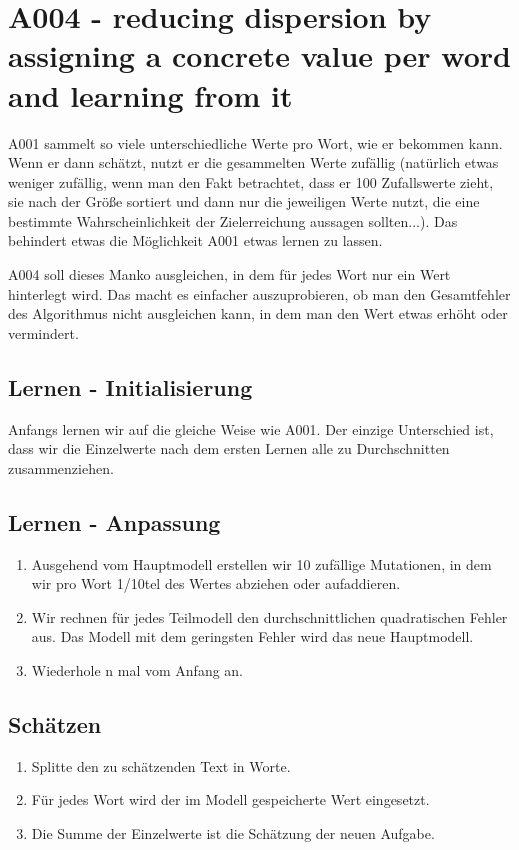 \newpage{}

\section{A004 - reducing dispersion by assigning a concrete value per
word and learning from
it}

A001 sammelt so viele unterschiedliche Werte pro Wort, wie er bekommen kann. 
Wenn er dann schätzt, nutzt er die gesammelten Werte zufällig (natürlich etwas weniger zufällig, wenn man den Fakt betrachtet, dass er 100 Zufallswerte zieht, sie nach der Größe sortiert und dann nur die jeweiligen Werte nutzt, die eine bestimmte Wahrscheinlichkeit der Zielerreichung aussagen sollten...).
Das behindert etwas die Möglichkeit A001 etwas lernen zu lassen.

A004 soll dieses Manko ausgleichen, in dem für jedes Wort nur ein Wert hinterlegt wird. Das macht es einfacher auszuprobieren, ob man den Gesamtfehler des Algorithmus nicht ausgleichen kann, in dem man den Wert etwas erhöht oder vermindert.

\subsection{Lernen - Initialisierung}

Anfangs lernen wir auf die gleiche Weise wie A001. 
Der einzige Unterschied ist, dass wir die Einzelwerte nach dem ersten Lernen alle zu Durchschnitten zusammenziehen. 

\subsection{Lernen - Anpassung}

\begin{enumerate}
        \tightlist
        \item Ausgehend vom Hauptmodell erstellen wir 10 zufällige Mutationen, in dem wir pro Wort 1/10tel des Wertes abziehen oder aufaddieren.
        \item Wir rechnen für jedes Teilmodell den durchschnittlichen quadratischen Fehler aus. Das Modell mit dem geringsten Fehler wird das neue Hauptmodell.
        \item Wiederhole n mal vom Anfang an.
\end{enumerate}

\subsection{Schätzen}

\begin{enumerate}
        \tightlist
        \item Splitte den zu schätzenden Text in Worte.
        \item Für jedes Wort wird der im Modell gespeicherte Wert eingesetzt.
        \item Die Summe der Einzelwerte ist die Schätzung der neuen Aufgabe.
\end{enumerate}


